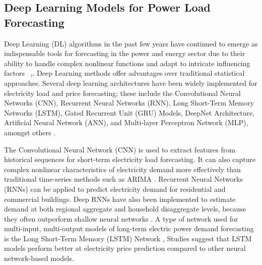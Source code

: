 \subsection {Deep Learning Models for Power Load Forecasting}
Deep Learning (DL) algorithms in the past few years have continued to emerge as indispensable tools for forecasting in the power and energy sector due to their ability to handle complex nonlinear functions and adapt to intricate influencing factors ~\cite {pallonetto2021},\cite{zhao2025short}. Deep Learning methods offer advantages over traditional statistical approaches. Several deep learning architectures have been widely implemented for electricity load and price forecasting; these include the Convolutional Neural Networks (CNN), Recurrent Neural Networks (RNN), Long Short-Term Memory Networks (LSTM), Gated Recurrent Unit (GRU) Models, DeepNet Architecture, Artificial Neural Network (ANN), and Multi-layer Perceptron Network (MLP), amongst others \cite{bedi2019deep,pallonetto2021,zhao2025short,ugbehe2025}. 


The Convolutional Neural Network (CNN) is used to extract features from historical sequences for short-term electricity load forecasting. It can also capture complex nonlinear characteristics of electricity demand more effectively than traditional time-series methods such as ARIMA \cite{bedi2019deep,zhao2025short}. Recurrent Neural Networks (RNNs) can be applied to predict electricity demand for residential and commercial buildings. Deep RNNs have also been implemented to estimate demand at both regional aggregate and household disaggregate levels, because they often outperform shallow neural networks \cite{bedi2019deep}. A type of network used for multi-input, multi-output models of long-term electric power demand forecasting is the Long Short-Term Memory (LSTM) Network \cite{ugbehe2025}, Studies suggest that LSTM models perform better at electricity price prediction compared to other neural network-based models. 

